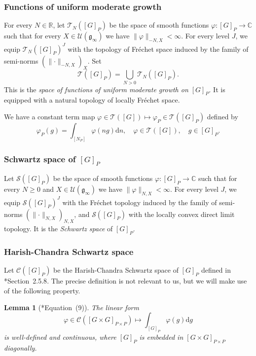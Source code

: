\documentclass[letterpaper,11pt]{amsart}
\newcommand{\fg}{\mathfrak{g}}
\newcommand{\C}{\mathbb{C}}
\newcommand{\R}{\mathbb{R}}
\newcommand{\cC}{\mathcal{C}}
\newcommand{\cS}{\mathcal{S}}
\newcommand{\cT}{\mathcal{T}}
\newcommand{\cU}{\mathcal{U}}
\newcommand{\rd}{\mathrm{d}}
\newcommand{\<}{\negthickspace}
\providecommand{\aabs}[1]{\lVert#1\rVert}
\theoremstyle{definition}
\theoremstyle{plain}
\newtheorem{lemma}[definition]{Lemma}
\theoremstyle{remark}
\numberwithin{equation}{section}
\begin{document}
\subsubsection{Functions of uniform moderate growth} For every $N \in \R$, let $\cT_N([G]_P)$ be the space of smooth functions $\varphi : [G]_P \to \C$ such that for every $X \in \cU(\fg_\infty)$ we have $\aabs{\varphi}_{-N,X} < \infty$. For every level $J$, we equip $\cT_N([G]_P)^J$ with the topology of Fréchet space induced by the family of semi-norms $(\aabs{\cdot}_{-N,X})_X$. Set
\begin{equation*}
    \cT([G]_P)=\bigcup_{N>0} \cT_N([G]_P).
\end{equation*}
This is the \emph{space of functions of uniform moderate growth on $[G]_P$}. It is equipped with a natural topology of locally Fréchet space.

We have a constant term map $ \varphi \in \cT([G]) \mapsto \varphi_P \in \cT([G]_P)$
defined by
\begin{equation}
\label{eq:constant_term_defi}
    \varphi_P(g)= \int_{[N_P]} \varphi(ng) \rd n , \quad \varphi \in \cT([G]), \quad g \in [G]_P.
\end{equation}

\subsubsection{Schwartz space of $[G]_P$}

Let $\cS([G]_P)$ be the space of smooth functions $\varphi : [G]_P \to \C$ such that for every $N \geq 0$ and $X \in \cU(\fg_\infty)$ we have $\aabs{\varphi}_{N,X} < \infty$. For every level $J$, we equip $\cS([G]_P)^J$ with the Fréchet topology induced by the family of semi-norms $(\aabs{\cdot}_{N,X})_{N,X}$, and $\cS([G]_P)$ with the locally convex direct limit topology. It is the \emph{Schwartz space} of $[G]_P$. 

\subsubsection{Harish-Chandra Schwartz space}
\label{subsec:HC_Schwartz}
Let $\cC([G]_P)$ be the Harish-Chandra Schwartz space of $[G]_P$ defined in \cite{BPCZ}*{Section~2.5.8}. The precise definition is not relevant to us, but we will make use of the following property.

\begin{lemma}[{\cite{Lap2}*{Equation~(9)}}]
    \label{lem:integration}
    The linear form
        \begin{equation*}
            \varphi \in \cC([G \times G]_{P \times P}) \mapsto \int_{[G]_P}\varphi(g) \rd g
        \end{equation*}
        is well-defined and continuous, where $[G]_P$ is embedded in $[G \times G]_{P \times P}$ diagonally.
\end{lemma}
\end{document}

